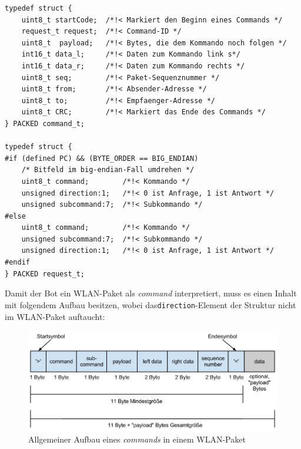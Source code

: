 \newpage

\begin{verbatim}
typedef struct {
    uint8_t startCode;  /*!< Markiert den Beginn eines Commands */
    request_t request;  /*!< Command-ID */
    uint8_t  payload;   /*!< Bytes, die dem Kommando noch folgen */
    int16_t data_l;     /*!< Daten zum Kommando link s*/
    int16_t data_r;     /*!< Daten zum Kommando rechts */
    uint8_t seq;        /*!< Paket-Sequenznummer */
    uint8_t from;       /*!< Absender-Adresse */
    uint8_t to;         /*!< Empfaenger-Adresse */
    uint8_t CRC;        /*!< Markiert das Ende des Commands */
} PACKED command_t;

typedef struct {
#if (defined PC) && (BYTE_ORDER == BIG_ENDIAN)
    /* Bitfeld im big-endian-Fall umdrehen */
    uint8_t command;        /*!< Kommando */
    unsigned direction:1;   /*!< 0 ist Anfrage, 1 ist Antwort */
    unsigned subcommand:7;  /*!< Subkommando */
#else
    uint8_t command;        /*!< Kommando */
    unsigned subcommand:7;  /*!< Subkommando */
    unsigned direction:1;   /*!< 0 ist Anfrage, 1 ist Antwort */
#endif
} PACKED request_t;
\end{verbatim}

Damit der Bot ein WLAN-Paket als \textit{command} interpretiert, muss es einen Inhalt mit folgendem Aufbau besitzen,
wobei das\verb|direction|-Element der Struktur nicht im WLAN-Paket auftaucht:
\begin{figure}[H]
    \centering
    \includegraphics[scale=0.5]{pic/ctBotWlanAllgemein}
    \caption{Allgemeiner Aufbau eines \textit{commands} in einem WLAN-Paket}
    \label{ctBotWlanAllgemein}
\end{figure}


